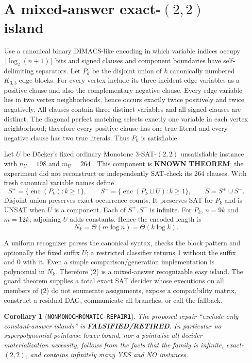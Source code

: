\documentclass[11pt]{article}
\newtheorem{corollary}[theorem]{Corollary}
\newcommand{\KNOWN}{\textbf{KNOWN THEOREM}}
\newcommand{\RETIRED}{\textbf{FALSIFIED/RETIRED}}
\begin{document}
\section{A mixed-answer exact-$(2,2)$ island}

Use a canonical binary DIMACS-like encoding in which variable indices occupy
$\lceil\log_2(n+1)\rceil$ bits and signed clauses and component boundaries have
self-delimiting separators.  Let $P_k$ be the disjoint union of $k$ canonically
numbered $K_{3,3}$ edge blocks.  For every vertex include its three incident
edge variables as a positive clause and also the complementary negative
clause.  Every edge variable lies in two vertex neighborhoods, hence occurs
exactly twice positively and twice negatively.  All clauses contain three
distinct variables and all signed clauses are distinct.  The diagonal perfect
matching selects exactly one variable in each vertex neighborhood; therefore
every positive clause has one true literal and every negative clause has two
true literals.  Thus $P_k$ is satisfiable.

Let $U$ be D\"ocker's fixed ordinary Monotone 3-SAT-$(2,2)$ unsatisfiable
instance with $n_U=198$ and $m_U=264$ \cite[Proposition~1]{docker}.  This
component is \KNOWN{}; the experiment did not reconstruct or independently
SAT-check its 264 clauses.  With fresh canonical variable names define
\[
 S^+=\{\operatorname{enc}(P_k):k\ge1\},\qquad
 S^-=\{\operatorname{enc}(P_k\sqcup U):k\ge1\},\qquad S=S^+\cup S^-.
 \tag{2}
\]
Disjoint union preserves exact occurrence counts.  It preserves SAT for
$P_k$ and is UNSAT when $U$ is a component.  Each of $S^+,S^-$ is infinite.
For $P_k$, $n=9k$ and $m=12k$; adjoining $U$ adds constants.  Hence the
encoded length is
\[
 N_k=\Theta(m\log n)=\Theta(k\log k).
 \tag{3}
\]

A uniform recognizer parses the canonical syntax, checks the block pattern and
optionally the fixed suffix $U$; a restricted classifier returns 1 without the
suffix and 0 with it.  Even a simple comparison/generation implementation is
polynomial in $N_k$.  Therefore (2) is a mixed-answer recognizable easy island.
The guard theorem supplies a total exact SAT decider whose executions on all
members of (2) do not enumerate assignments, expose a compatibility matrix,
construct a residual DAG, communicate all branches, or call the fallback.

\begin{corollary}[\texttt{NONMONOCHROMATIC-REPAIR1}]
The proposed repair ``exclude only constant-answer islands'' is
\RETIRED{}.  In particular no superpolynomial pointwise lower bound, nor a
pointwise all-decider materialization necessity, follows from the facts that
the family is infinite, exact-$(2,2)$, and contains infinitely many YES and NO
instances.
\end{corollary}
\end{document}
